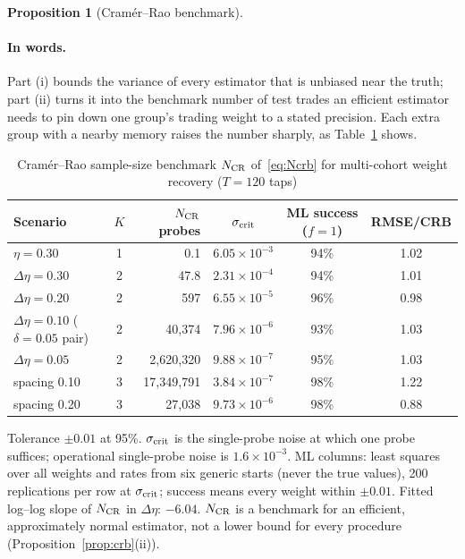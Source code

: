 \documentclass[12pt]{article}
\newtheorem{proposition}[theorem]{Proposition}
\theoremstyle{definition}
\theoremstyle{remark}
\begin{document}
\begin{proposition}[Cram\'er--Rao benchmark]
\begin{enumerate}[label=(\roman*)]
\end{enumerate}
\end{proposition}

\paragraph{In words.} Part (i) bounds the variance of every estimator that is unbiased near the truth; part (ii) turns it into the benchmark number of test trades an efficient estimator needs to pin down one group's trading weight to a stated precision. Each extra group with a nearby memory raises the number sharply, as Table~\ref{tab:crb} shows.

\begin{table}[t]\centering\small
\begin{threeparttable}
\caption{Cram\'er--Rao sample-size benchmark $N_{\rm CR}$ of~\eqref{eq:Ncrb} for multi-cohort weight recovery ($T=120$ taps)}\label{tab:crb}
\begin{tabular}{lcrccc}
\toprule
Scenario & $K$ & $N_{\rm CR}$ probes & $\sigma_{\rm crit}$ & ML success ($f=1$) & RMSE/CRB\\
\midrule
$\eta=0.30$ & 1 & 0.1 & $6.05\times10^{-3}$ & 94\% & 1.02\\
$\Delta\eta=0.30$ & 2 & 47.8 & $2.31\times10^{-4}$ & 94\% & 1.01\\
$\Delta\eta=0.20$ & 2 & 597 & $6.55\times10^{-5}$ & 96\% & 0.98\\
$\Delta\eta=0.10$ ($\delta=0.05$ pair) & 2 & 40{,}374 & $7.96\times10^{-6}$ & 93\% & 1.03\\
$\Delta\eta=0.05$ & 2 & 2{,}620{,}320 & $9.88\times10^{-7}$ & 95\% & 1.03\\
spacing 0.10 & 3 & 17{,}349{,}791 & $3.84\times10^{-7}$ & 98\% & 1.22\\
spacing 0.20 & 3 & 27{,}038 & $9.73\times10^{-6}$ & 98\% & 0.88\\
\bottomrule
\end{tabular}
\begin{tablenotes}\footnotesize\item Tolerance $\pm0.01$ at 95\%. $\sigma_{\rm crit}$ is the single-probe noise at which one probe suffices; operational single-probe noise is $1.6\times10^{-3}$. ML columns: least squares over all weights and rates from six generic starts (never the true values), 200 replications per row at $\sigma_{\rm crit}$; success means every weight within $\pm0.01$. Fitted log--log slope of $N_{\rm CR}$ in $\Delta\eta$: $-6.04$. $N_{\rm CR}$ is a benchmark for an efficient, approximately normal estimator, not a lower bound for every procedure (Proposition~\ref{prop:crb}(ii)). \end{tablenotes}
\end{threeparttable}
\end{table}
\end{document}
